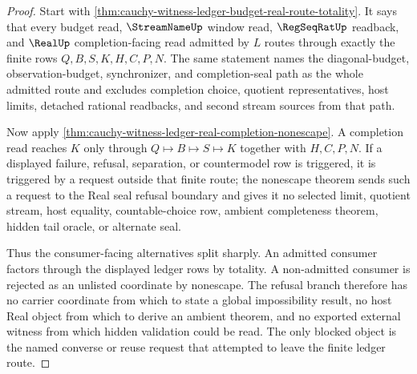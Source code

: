 \begin{proof}
Start with \autoref{thm:cauchy-witness-ledger-budget-real-route-totality}. It says that every budget read, $\StreamNameUp$ window read, $\RegSeqRatUp$ readback, and $\RealUp$ completion-facing read admitted by $L$ routes through exactly the finite rows $Q,B,S,K,H,C,P,N$. The same statement names the diagonal-budget, observation-budget, synchronizer, and completion-seal path as the whole admitted route and excludes completion choice, quotient representatives, host limits, detached rational readbacks, and second stream sources from that path.

Now apply \autoref{thm:cauchy-witness-ledger-real-completion-nonescape}. A completion read reaches $K$ only through $Q \longmapsto B \longmapsto S \longmapsto K$ together with $H,C,P,N$. If a displayed failure, refusal, separation, or countermodel row is triggered, it is triggered by a request outside that finite route; the nonescape theorem sends such a request to the Real seal refusal boundary and gives it no selected limit, quotient stream, host equality, countable-choice row, ambient completeness theorem, hidden tail oracle, or alternate seal.

Thus the consumer-facing alternatives split sharply. An admitted consumer factors through the displayed ledger rows by totality. A non-admitted consumer is rejected as an unlisted coordinate by nonescape. The refusal branch therefore has no carrier coordinate from which to state a global impossibility result, no host Real object from which to derive an ambient theorem, and no exported external witness from which hidden validation could be read. The only blocked object is the named converse or reuse request that attempted to leave the finite ledger route.
\end{proof}
